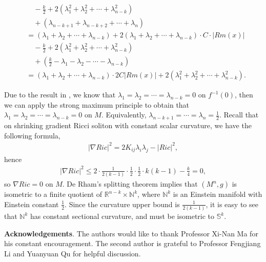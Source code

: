\documentclass[12pt]{amsart}
\newcommand{\ban}{\begin{eqnarray*}}
\newcommand{\ean}{\end{eqnarray*}}
\begin{document}
\begin{align*}
		&\quad - \frac{k}{2} + 2\left( \lambda_1^2 + \lambda_2^2 + \cdots + \lambda_{n-k}^2 \right) \\
		&\quad + \left( \lambda_{n-k+1} + \lambda_{n-k+2} + \cdots + \lambda_n \right) \\
		&= \left( \lambda_1 + \lambda_2 + \cdots + \lambda_{n-k} \right)+2 \left( \lambda_1 + \lambda_2 + \cdots + \lambda_{n-k} \right)\cdot C\cdot|Rm(x)| \\
		&\quad - \frac{k}{2} + 2\left( \lambda_1^2 + \lambda_2^2 + \cdots + \lambda_{n-k}^2 \right) \\
		&\quad+\left(\frac{k}{2}-\lambda_1-\lambda_2-\cdots-\lambda_{n-k}\right) \\
		&=\left( \lambda_1 + \lambda_2 + \cdots + \lambda_{n-k} \right)\cdot2C|Rm(x)|+ 2\left( \lambda_1^2 + \lambda_2^2 + \cdots + \lambda_{n-k}^2 \right).
\end{align*}

Due to the result in \cite{FR16}, we know that $\lambda_1=\lambda_2=\cdots=\lambda_{n-k}=0$ on $f^{-1}(0)$, then we can apply the strong maximum principle to obtain that $\lambda_1=\lambda_2=\cdots=\lambda_{n-k}=0$ on $M$. Equivalently, $\lambda_{n-k+1}=\cdots=\lambda_n=\frac{1}{2}$.
Recall that on shrinking gradient Ricci soliton with constant scalar curvature, we have the following formula,
\ban
|\nabla Ric|^2=2 K_{ij}\lambda_i \lambda_j-|Ric|^2,
\ean
hence
\ban
|\nabla Ric|^2 \leq 2\cdot \frac{1}{2(k-1)}\cdot\frac{1}{2}\cdot\frac{1}{2}\cdot k(k-1)-\frac{k}{4}=0,
\ean
so $\nabla Ric=0$ on $M$. De Rham's splitting theorem implies that $(M^n, g)$ is isometric to a finite quotient of $\mathbb{R}^{n-k}\times \mathbb{N}^k$, where $\mathbb{N}^k$ is an Einstein manifold with Einstein constant $\frac{1}{2}$. Since the curvature upper bound is $\frac{1}{2(k-1)}$, it is easy to see that $\mathbb{N}^k$ has constant sectional curvature, and must be isometric to $\mathbb{S}^k$.

	
\vspace{0.5cm}
	\textbf{Acknowledgements}.
	The  authors would like to thank Professor Xi-Nan Ma for his constant encouragement.  The  second author is grateful to Professor Fengjiang Li and Yuanyuan Qu for helpful discussion.
	
\end{document}
